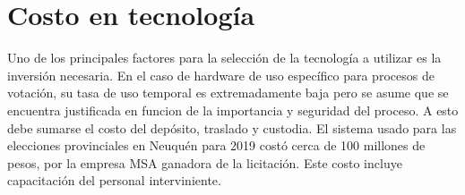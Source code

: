 \section{Costo en tecnología}
Uno de los principales factores para la selección de la tecnología a utilizar es la inversión necesaria. En el caso de hardware de uso específico para procesos de votación, su tasa de uso temporal es extremadamente baja pero se asume que se encuentra justificada en funcion de la importancia y seguridad del proceso. A esto debe sumarse el costo del depósito, traslado y custodia. \newline
El sistema usado para las elecciones provinciales en Neuquén para 2019 costó cerca de 100 millones de pesos, por la empresa MSA ganadora de la licitación. Este costo incluye capacitación del personal interviniente.\cite{eleccionesNeuquen}
